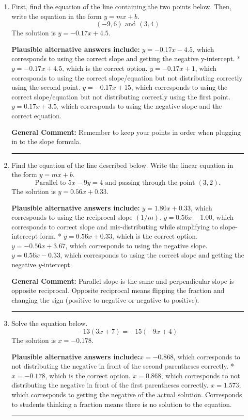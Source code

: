 \documentclass{extbook}[14pt]
\newcommand{\litem}[1]{\item #1

\rule{\textwidth}{0.4pt}}
\begin{document}
\begin{enumerate}\litem{
First, find the equation of the line containing the two points below. Then, write the equation in the form $ y=mx+b $.
\[ (-9, 6) \text{ and } (3, 4) \]The solution is \( y = -0.17x + 4.5 \).\begin{enumerate}[label=\Alph*.]
\textbf{Plausible alternative answers include:} $y = -0.17x -4.5$, which corresponds to using the correct slope and getting the negative y-intercept.
* $y = -0.17x + 4.5$, which is the correct option.
 $y = -0.17x + 1$, which corresponds to using the correct slope/equation but not distributing correctly using the second point.
 $y = -0.17x + 15$, which corresponds to using the correct slope/equation but not distributing correctly using the first point.
 $y = 0.17x + 3.5$, which corresponds to using the negative slope and the correct equation.
\end{enumerate}

\textbf{General Comment:} Remember to keep your points in order when plugging in to the slope formula.
}
\litem{
Find the equation of the line described below. Write the linear equation in the form $y=mx+b$.
\[ \text{Parallel to } 5 x - 9 y = 4 \text{ and passing through the point } (3, 2). \]The solution is \( y = 0.56x + 0.33 \).\begin{enumerate}[label=\Alph*.]
\textbf{Plausible alternative answers include:} $y = 1.80x + 0.33$, which corresponds to using the reciprocal slope $(1/m)$.
 $y = 0.56x - 1.00$, which corresponds to correct slope and mis-distributing while simplifying to slope-intercept form.
* $y = 0.56x + 0.33$, which is the correct option.
 $y = -0.56x + 3.67$, which corresponds to using the negative slope.
 $y = 0.56x - 0.33$, which corresponds to using the correct slope and getting the negative $y$-intercept.
\end{enumerate}

\textbf{General Comment:} Parallel slope is the same and perpendicular slope is opposite reciprocal. Opposite reciprocal means flipping the fraction and changing the sign (positive to negative or negative to positive).
}
\litem{
Solve the equation below.
\[ -13(3x + 7) = -15(-9x + 4) \]The solution is \( x = -0.178 \).\begin{enumerate}[label=\Alph*.]
\textbf{Plausible alternative answers include:}$x = -0.868$, which corresponds to not distributing the negative in front of the second parentheses correctly.
* $x = -0.178$, which is the correct option.
$x = 0.868$, which corresponds to not distributing the negative in front of the first parentheses correctly.
$x = 1.573$, which corresponds to getting the negative of the actual solution.
Corresponds to students thinking a fraction means there is no solution to the equation.
\end{enumerate}

}
\end{enumerate}
\end{document}
